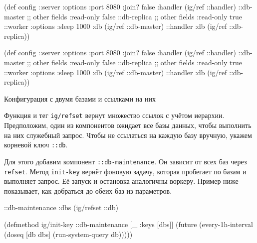 \begin{listing}[ht!]

\ifx\DEVICETYPE\MOBILE

\begin{english}
  \begin{clojure}
(def config
  {::server {:options {:port 8080
                       :join? false}
             :handler (ig/ref ::handler)}
   ::db-master {;; other fields
                :read-only false}
   ::db-replica {;; other fields
                 :read-only true}
   ::worker {:options {:sleep 1000}
             :db (ig/ref ::db-master)}
   ::handler {:db (ig/ref
                    ::db-replica)}})
  \end{clojure}
\end{english}

\else

\begin{english}
  \begin{clojure}
(def config
  {::server {:options {:port 8080 :join? false}
             :handler (ig/ref ::handler)}
   ::db-master {;; other fields
                :read-only false}
   ::db-replica {;; other fields
                 :read-only true}
   ::worker {:options {:sleep 1000}
             :db (ig/ref ::db-master)}
   ::handler {:db (ig/ref ::db-replica)}})
  \end{clojure}
\end{english}

\fi

\caption{Конфигурация с двумя базами и ссылками на них}
\label{fig:config-refset}

\end{listing}

Функция и тег \verb|ig/refset| вернут множество ссылок с учётом
иерархии. Предположим, один из компонентов ожидает все базы данных, чтобы
выполнить на них служебный запрос. Чтобы не ссылаться на каждую базу вручную,
укажем корневой ключ \verb|::db|.

Для этого добавим компонент \texttt{::db-main\-te\-nance}. Он зависит от всех баз
через \verb|refset|. Метод \verb|init-key| вернёт фоновую задачу, которая
пробегает по базам и выполняет запрос. Её запуск и остановка аналогичны
воркеру. Пример ниже показывает, как добраться до обеих баз из параметров.

\ifx\DEVICETYPE\MOBILE

\begin{english}
  \begin{clojure}
{::db-maintenance
 {:dbs (ig/refset ::db)}}

(defmethod ig/init-key ::db-maintenance
  [_ {:keys [dbs]}]
  (future
    (every-1h-interval
      (doseq [db dbs]
        (run-system-query db)))))
  \end{clojure}
\end{english}

